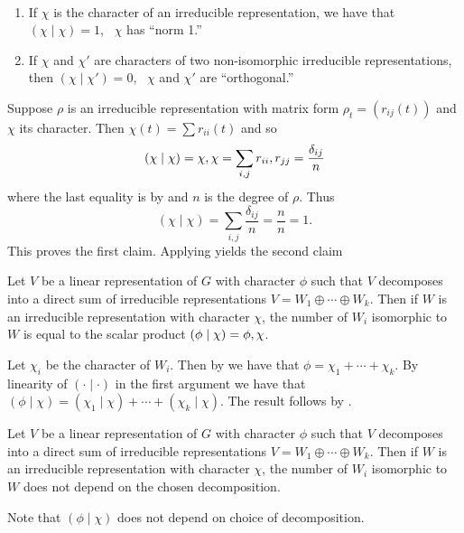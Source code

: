 \documentclass[letterpaper, 11pt, oneside]{book}
\begin{document}
\begin{thrm}\label{thrm:norm_orthogonal_characters}\
  \begin{enumerate}
  \item If $\chi$ is the character of an irreducible representation, we have that $(\chi \mid \chi) = 1$, \ie\ $\chi$ has ``norm 1.''
  \item If $\chi$ and $\chi'$ are characters of two non-isomorphic irreducible representations, then $(\chi \mid \chi') = 0$, \ie\ $\chi$ and $\chi'$ are ``orthogonal.''
  \end{enumerate}
\end{thrm}
\begin{pf}
  Suppose $\rho$ is an irreducible representation with matrix form $\rho_{t} = (r_{ij}(t))$ and $\chi$ its character.
  Then $\chi(t) = \sum r_{ii}(t)$ and so
  \[
    (\chi \mid \chi) = \inner{\chi, \chi} = \sum_{i, j} \inner{r_{ii}, r_{jj}} = \frac{\delta_{ij}}{n}
  \]
  where the last equality is by  and $n$ is the degree of $\rho$.
  Thus
  \[
    (\chi \mid \chi) = \sum_{i, j} \frac{\delta_{ij}}{n} = \frac{n}{n} = 1.
  \]
  This proves the first claim.
  Applying  yields the second claim
\end{pf}

\begin{thrm}\label{thrm:scalar_counts_num_iso}
  Let $V$ be a linear representation of $G$ with character $\phi$ such that $V$ decomposes into a direct sum of irreducible representations $V = W_{1} \oplus \cdots \oplus W_{k}$.
  Then if $W$ is an irreducible representation with character $\chi$, the number of $W_{i}$ isomorphic to $W$ is equal to the scalar product $(\phi \mid \chi) = \inner{\phi, \chi}$.
\end{thrm}
\begin{pf}
  Let $\chi_{i}$ be the character of $W_{i}$.
  Then by  we have that $\phi = \chi_{1} + \cdots + \chi_{k}$.
  By linearity of $(\cdot \mid \cdot)$ in the first argument we have that $(\phi \mid \chi) = (\chi_{1} \mid \chi) + \cdots + (\chi_{k} \mid \chi)$.
  The result follows by \Cref{thrm:norm_orthogonal_characters}.
\end{pf}

\begin{cor}\label{cor:scalar_counts_num_iso_cor_1}
  Let $V$ be a linear representation of $G$ with character $\phi$ such that $V$ decomposes into a direct sum of irreducible representations $V = W_{1} \oplus \cdots \oplus W_{k}$.
  Then if $W$ is an irreducible representation with character $\chi$, the number of $W_{i}$ isomorphic to $W$ does not depend on the chosen decomposition.
\end{cor}
\begin{pf}
  Note that $(\phi \mid \chi)$ does not depend on choice of decomposition.
\end{pf}
\end{document}
